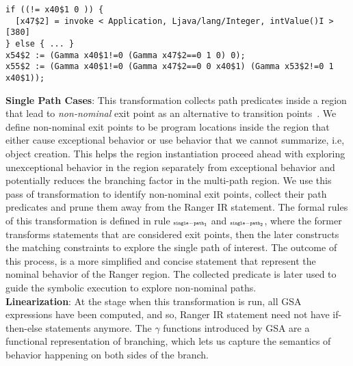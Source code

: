 \begin{lstlisting}
if ((!= x40$1 0 )) {
  [x47$2] = invoke < Application, Ljava/lang/Integer, intValue()I >[380]
} else { ... }
x54$2 := (Gamma x40$1!=0 (Gamma x47$2==0 1 0) 0);
x55$2 := (Gamma x40$1!=0 (Gamma x47$2==0 0 x40$1) (Gamma x53$2!=0 1 x40$1));
\end{lstlisting}
%
\textbf{Single Path Cases}: This transformation collects path predicates inside a region that lead to
\textit{non-nominal} exit point as an alternative to transition points~\cite{veritesting}.
%
We define non-nominal exit points to be program locations inside the region that either cause
exceptional behavior or use behavior that we cannot summarize, i.e, object creation.
%
This helps the region instantiation proceed ahead with exploring unexceptional behavior in the region separately from
exceptional behavior and potentially reduces the branching factor in the multi-path region.
%
%
We use this pass of transformation to identify non-nominal exit points, collect their path predicates and prune them away from the
Ranger IR statement. The formal rules of this transformation is defined in rule $\scriptscriptstyle\mathtt{single-path_1}$ and
$\scriptscriptstyle\mathtt{single-path_2}$, where the former transforms statements that are considered exit points, then the later constructs
the matching constraints to explore the single path of interest.
%
The outcome of this process, is a more simplified and concise statement that represent the nominal behavior of the Ranger region.
%
The collected predicate is later used to guide the symbolic execution to explore non-nominal paths.\\
%
\textbf{Linearization}:
At the stage when this transformation is run, all GSA expressions have been computed, and so, Ranger IR statement
need not have if-then-else statements anymore.
%
The $\gamma$ functions introduced by GSA are a functional representation of branching, which lets us
capture the semantics of behavior happening on both sides of the branch.

